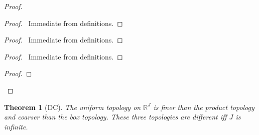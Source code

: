 \documentclass{report}
\let\qed\relax
\newtheorem{thm}[lm]{Theorem}
\theoremstyle{definition}
\begin{document}
  \begin{proof}
    \pf
    \begin{proof}
      \pf\ Immediate from definitions.
    \end{proof}
    \begin{proof}
      \pf\ Immediate from definitions.
    \end{proof}
    \begin{proof}
      \pf\ Immediate from definitions.
    \end{proof}
    \begin{proof}
      \pf
    \end{proof}
    \qed
  \end{proof}

  \begin{thm}[DC]
  	\label{thm:topology:product:compare}
    The uniform topology on $\mathbb{R}^J$ is finer than the product topology
    and coarser than the box topology. These three topologies are different iff
    $J$
    is infinite.
  \end{thm}
\end{document}
